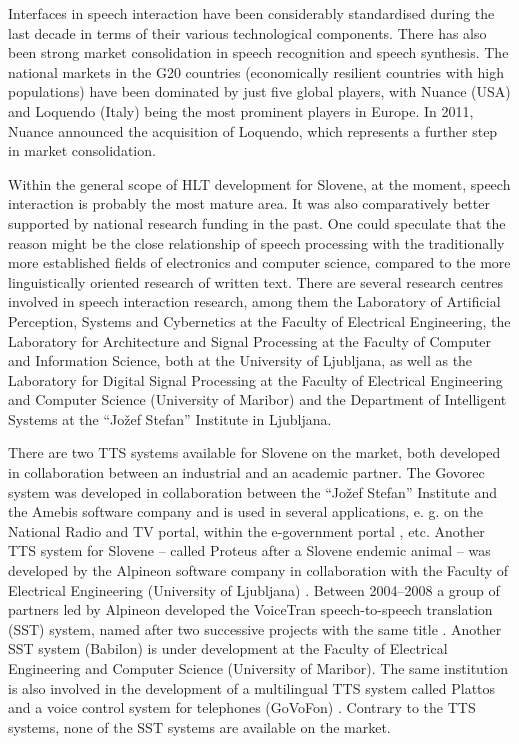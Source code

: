 \begin{multicols}{2}
Interfaces in speech interaction have been considerably standardised during the last decade in terms of their various technological components. There has also been strong market consolidation in speech recognition and speech synthesis. The national markets in the G20 countries (economically resilient countries with high populations) have been dominated by just five global players, with Nuance (USA) and Loquendo (Italy) being the most prominent players in Europe. In 2011, Nuance announced the acquisition of Loquendo, which represents a further step in market consolidation.

Within the general scope of HLT development for Slovene, at the moment, speech interaction is probably the most mature area. It was also comparatively better supported by national research funding in the past. One could speculate that the reason might be the close relationship of speech processing with the traditionally more established fields of electronics and computer science, compared to the more linguistically oriented research of written text. There are several research centres involved in speech interaction research, among them the Laboratory of Artificial Perception, Systems and Cybernetics at the Faculty of Electrical Engineering, the Laboratory for Architecture and Signal Processing at the Faculty of Computer and Information Science, both at the University of Ljubljana, as well as the Laboratory for Digital Signal Processing at the Faculty of Electrical Engineering and Computer Science (University of Maribor) and the Department of Intelligent Systems at the “Jožef Stefan” Institute in Ljubljana. 

There are two TTS systems available for Slovene on the market, both developed in collaboration between an industrial and an academic partner. The Govorec system was developed in collaboration between the “Jožef Stefan” Institute and the Amebis software company and is used in several applications, e. g. on the National Radio and TV portal, within the e-government portal \cite{Amb3}, etc.   Another TTS system for Slovene – called Proteus after a Slovene endemic animal – was developed by the Alpineon software company in collaboration with the Faculty of Electrical Engineering (University of Ljubljana) \cite{Alp1}.  Between 2004--2008 a group of partners led by Alpineon developed the VoiceTran speech-to-speech translation (SST) system, named after two successive projects with the same title \cite{Alp2}.  Another SST system (Babilon) is under development at the Faculty of Electrical Engineering and Computer Science (University of Maribor). The same institution is also involved in the development of a multilingual TTS system called Plattos and a voice control system for telephones (GoVoFon) \cite{Lab1}.  Contrary to the TTS systems, none of the SST systems are available on the market. 


\end{multicols}
